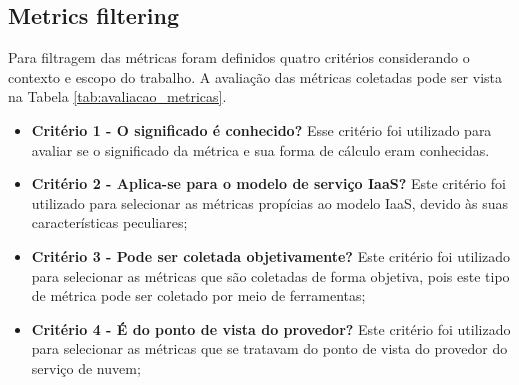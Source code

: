 \documentclass[conference]{IEEEtran}
\begin{document}
     
  \subsection{Metrics filtering}
  
      Para filtragem das métricas foram definidos quatro critérios considerando o contexto e escopo do trabalho. A avaliação das
      métricas coletadas pode ser vista na Tabela \ref{tab:avaliacao_metricas}.
   
	\begin{itemize}
	 \item \textbf{Critério 1 - O significado é conhecido?}
	    \subitem Esse critério foi utilizado para avaliar se o significado da métrica e sua forma de cálculo eram conhecidas.
	 \item \textbf{Critério 2 - Aplica-se para o modelo de serviço IaaS?}
	    \subitem Este critério foi utilizado para selecionar as métricas propícias ao modelo IaaS, 
	    devido às suas características peculiares;
	 \item \textbf{Critério 3 - Pode ser coletada objetivamente?}
	    \subitem Este critério foi utilizado para selecionar as métricas que são coletadas de forma objetiva, pois este tipo
	    de métrica pode ser coletado por meio de ferramentas;
	 \item \textbf{Critério 4 - É do ponto de vista do provedor?}
	    \subitem Este critério foi utilizado para selecionar as métricas que se tratavam do ponto de vista do provedor do serviço
	    de nuvem;
	\end{itemize}
	
\end{document}
